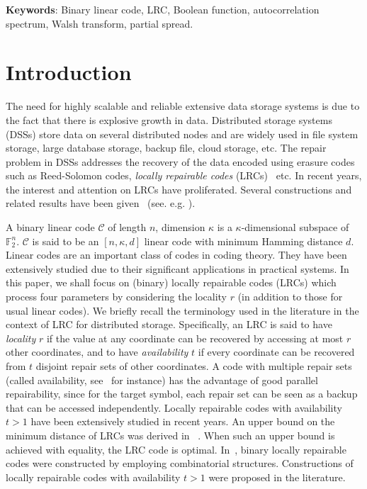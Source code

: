\documentclass[10pt]{article}
\newcommand{\0}{\textbf{0}}
\newcommand{\1}{\textbf{1}}
\newcommand{\tr}{\mathrm{Tr}_1^k}
\begin{document}
{\bf Keywords}: Binary linear code, LRC, Boolean function, autocorrelation spectrum, Walsh transform, partial spread.


\section{Introduction}


The need for highly scalable and reliable extensive data storage systems is due to the fact that there is
explosive growth in data. Distributed storage systems (DSSs) store data on several distributed
nodes and are widely used in file system storage, large database storage, backup file,
cloud storage, etc. The repair problem in DSSs addresses
the recovery of the data encoded using erasure codes such as Reed-Solomon codes, \emph{locally repairable codes} (LRCs)~\cite{Huang2012erasure} etc.
In recent years, the interest and attention on LRCs have proliferated.
Several constructions and related results have been given~ (see. e.g. \cite{jin2019constructions,cai2019optimal,wang2021construction,zhang2020locally}).

A binary linear code $\mathcal{C}$ of length $n$, dimension $\kappa$ is a $\kappa$-dimensional subspace of $\mathbb{F}_2^n$.  $\mathcal{C}$ is said to be an $[n,\kappa,d]$ linear code with minimum Hamming distance $d$. Linear codes are an important class of codes in coding theory. They have been extensively studied due to their significant applications in practical systems. In this paper, we shall focus on (binary) locally repairable codes (LRCs) which
process four parameters by considering the locality $r$ (in addition to those for usual linear codes).
We briefly recall the terminology used in the literature in the context of LRC for distributed storage. Specifically, an LRC is said to have \emph{locality} $r$ if
the value at any coordinate can be recovered by accessing
at most $r$ other coordinates,
and to have \emph{availability} $t$ if every coordinate can be recovered from $t$ disjoint repair
sets of other coordinates.
A code with multiple repair sets (called availability, see~\cite{PamiesISIT2013,2016Locality} for instance) has the advantage of good
parallel repairability, since for the target symbol, each repair set can be seen as
a backup that can be accessed
independently.
Locally repairable codes with availability $t > 1$ have
been extensively studied in recent years. An upper
bound on the minimum distance of LRCs
was derived in ~\cite{2015Bounds}.  When such an upper bound is achieved with equality, the LRC code is optimal.
In~\cite{2013Repair, 2015AnWang}, binary locally repairable codes were constructed by employing combinatorial structures.
Constructions of locally repairable codes
with availability $t > 1$ were proposed in the literature.
\end{document}
